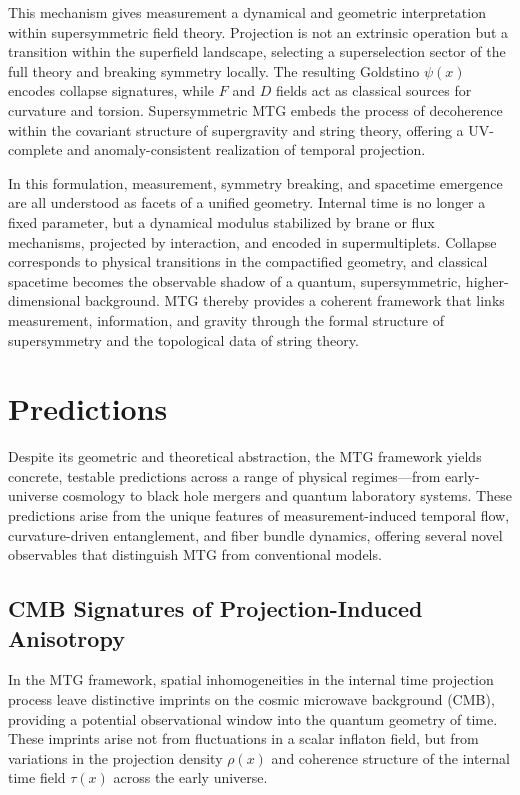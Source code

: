 \documentclass[11pt]{article}
\begin{document}
This mechanism gives measurement a dynamical and geometric interpretation within supersymmetric field theory. Projection is not an extrinsic operation but a transition within the superfield landscape, selecting a superselection sector of the full theory and breaking symmetry locally. The resulting Goldstino \( \psi(x) \) encodes collapse signatures, while \( F \) and \( D \) fields act as classical sources for curvature and torsion. Supersymmetric MTG embeds the process of decoherence within the covariant structure of supergravity and string theory, offering a UV-complete and anomaly-consistent realization of temporal projection.

In this formulation, measurement, symmetry breaking, and spacetime emergence are all understood as facets of a unified geometry. Internal time is no longer a fixed parameter, but a dynamical modulus stabilized by brane or flux mechanisms, projected by interaction, and encoded in supermultiplets. Collapse corresponds to physical transitions in the compactified geometry, and classical spacetime becomes the observable shadow of a quantum, supersymmetric, higher-dimensional background. MTG thereby provides a coherent framework that links measurement, information, and gravity through the formal structure of supersymmetry and the topological data of string theory.


\section{Predictions}\label{sec:10}
Despite its geometric and theoretical abstraction, the MTG framework yields concrete, testable predictions across a range of physical regimes—from early-universe cosmology to black hole mergers and quantum laboratory systems. These predictions arise from the unique features of measurement-induced temporal flow, curvature-driven entanglement, and fiber bundle dynamics, offering several novel observables that distinguish MTG from conventional models.
\subsection{CMB Signatures of Projection-Induced Anisotropy}

In the MTG framework, spatial inhomogeneities in the internal time projection process leave distinctive imprints on the cosmic microwave background (CMB), providing a potential observational window into the quantum geometry of time. These imprints arise not from fluctuations in a scalar inflaton field, but from variations in the projection density $\rho(x)$ and coherence structure of the internal time field $\tau(x)$ across the early universe.
\end{document}
